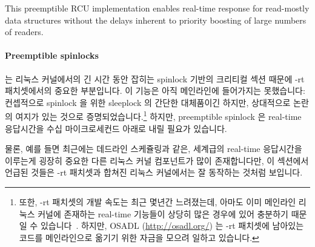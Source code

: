 This preemptible RCU implementation enables real-time response for
read-mostly data structures without the delays inherent to priority
boosting of large numbers of readers.
\fi

\paragraph{Preemptible spinlocks}
는 리눅스 커널에서의 긴 시간 동안 잡히는 spinlock 기반의 크리티컬 섹션 때문에
-rt 패치셋에서의 중요한 부분입니다.
이 기능은 아직 메인라인에 들어가지는 못했습니다: 컨셉적으로 spinlock 을 위한
sleeplock 의 간단한 대체품이긴 하지만, 상대적으로 논란의 여지가 있는 것으로
증명되었습니다.\footnote{
	또한, -rt 패치셋의 개발 속도는 최근 몇년간 느려졌는데, 아마도 이미
	메인라인 리눅스 커널에 존재하는 real-time 기능들이 상당히 많은 경우에
	있어 충분하기 때문일 수
	있습니다~\cite{JakeEdge2013Future-rtLinux,JakeEdge2014Future-rtLinux}.
	하지만, OSADL (\url{http://osadl.org/}) 는 -rt 패치셋에 남아있는 코드를
	메인라인으로 옮기기 위한 자금을 모으려 일하고 있습니다.}
하지만, preemptible spinlock 은 real-time 응답시간을 수십 마이크로세컨드 아래로
내릴 필요가 있습니다.

물론, 예를 들면 최근에는 데드라인 스케쥴링과 같은, 세계급의 real-time
응답시간을 이루는게 굉장히 중요한 다른 리눅스 커널 컴포넌트가 많이
존재합니다만, 이 섹션에서 언급된 것들은 -rt 패치셋과 합쳐진 리눅스 커널에서는
잘 동작하는 것처럼 보입니다.

